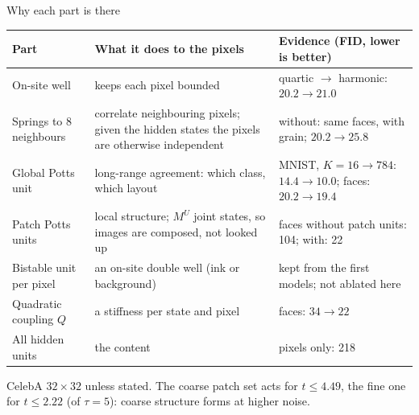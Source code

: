 \documentclass[aspectratio=169,10pt]{beamer}
\begin{document}
\begin{frame}{Why each part is there}
  \footnotesize
  \setlength{\tabcolsep}{5pt}
  \begin{tabular}{@{}p{3.1cm}p{5.5cm}p{4.9cm}@{}}
    \toprule
    Part & What it does to the pixels & Evidence (FID, lower is better) \\
    \midrule
    On-site well & keeps each pixel bounded & quartic $\to$ harmonic: $20.2\to21.0$ \\[3pt]
    Springs to 8 neighbours & correlate neighbouring pixels; given the hidden states the pixels
      are otherwise independent & without: same faces, with grain; $20.2\to25.8$ \\[3pt]
    {\color{globalcol}Global Potts unit} & long-range agreement: which class, which layout &
      MNIST, $K=16\to784$: $14.4\to10.0$; faces: $20.2\to19.4$ \\[3pt]
    {\color{coarsecol}Patch} {\color{finecol}Potts units} & local structure; $M^{U}$ joint states, so
      images are composed, not looked up & faces without patch units: 104; with: 22
       \\[3pt]
    Bistable unit per pixel & an on-site double well (ink or background) & kept from the first
      models; not ablated here \\[3pt]
    Quadratic coupling $Q$ & a stiffness per state and pixel & faces: $34\to22$  \\[3pt]
    All hidden units & the content & pixels only: 218 \\
    \bottomrule
  \end{tabular}

  \vspace{0.25cm}
  {\footnotesize CelebA $32\times32$ unless stated. The coarse patch set acts for $t\le4.49$, the fine one
  for $t\le2.22$ (of $\tau=5$): coarse structure forms at higher noise.}
\end{frame}
\end{document}
